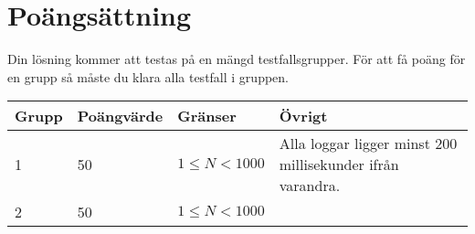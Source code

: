 \section*{Poängsättning}
Din lösning kommer att testas på en mängd testfallsgrupper. För att få poäng för en grupp
så måste du klara alla testfall i gruppen.

\begin{tabular}{| l | l | l | l |}
\hline
Grupp & Poängvärde & Gränser & Övrigt \\ \hline
1     & 50         &  $1 \le N < 1000$ & Alla loggar ligger minst 200 millisekunder ifrån varandra.\\ \hline
2     & 50         &  $1 \le N < 1000$ & \\ \hline
\end{tabular}
